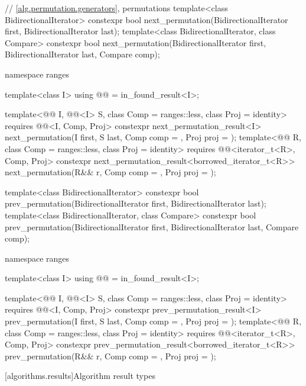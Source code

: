 \begin{codeblock}
{  // \ref{alg.permutation.generators}, permutations
  template<class BidirectionalIterator>
    constexpr bool next_permutation(BidirectionalIterator first,
                                    BidirectionalIterator last);
  template<class BidirectionalIterator, class Compare>
    constexpr bool next_permutation(BidirectionalIterator first,
                                    BidirectionalIterator last, Compare comp);

  namespace ranges {
    template<class I>
      using @@ = in_found_result<I>;

    template<@@ I, @@<I> S, class Comp = ranges::less,
             class Proj = identity>
      requires @@<I, Comp, Proj>
      constexpr next_permutation_result<I>
        next_permutation(I first, S last, Comp comp = {}, Proj proj = {});
    template<@@ R, class Comp = ranges::less,
             class Proj = identity>
      requires @@<iterator_t<R>, Comp, Proj>
      constexpr next_permutation_result<borrowed_iterator_t<R>>
        next_permutation(R&& r, Comp comp = {}, Proj proj = {});
  }

  template<class BidirectionalIterator>
    constexpr bool prev_permutation(BidirectionalIterator first,
                                    BidirectionalIterator last);
  template<class BidirectionalIterator, class Compare>
    constexpr bool prev_permutation(BidirectionalIterator first,
                                    BidirectionalIterator last, Compare comp);

  namespace ranges {
    template<class I>
      using @@ = in_found_result<I>;

    template<@@ I, @@<I> S, class Comp = ranges::less,
             class Proj = identity>
      requires @@<I, Comp, Proj>
      constexpr prev_permutation_result<I>
        prev_permutation(I first, S last, Comp comp = {}, Proj proj = {});
    template<@@ R, class Comp = ranges::less,
             class Proj = identity>
      requires @@<iterator_t<R>, Comp, Proj>
      constexpr prev_permutation_result<borrowed_iterator_t<R>>
        prev_permutation(R&& r, Comp comp = {}, Proj proj = {});
  }
}
\end{codeblock}

[algorithms.results]{Algorithm result types}

